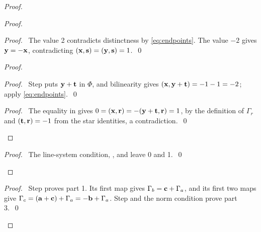 \begin{proof}
{  }
 \begin{proof}
  \begin{proof}
   \pf\ The value 2 contradicts distinctness by \eqref{eq:endpoints}.
   The value $-2$ gives ${\mathbf y}=-{\mathbf x}$, contradicting
   $({\mathbf x},{\mathbf s})=({\mathbf y},{\mathbf s})=1$.~\qed
  \end{proof}
  \begin{proof}
   \begin{proof}
    \pf\ Step  puts ${\mathbf y}+{\mathbf t}$ in $\Phi$, and bilinearity gives
    $({\mathbf x},{\mathbf y}+{\mathbf t})=-1-1=-2$; apply \eqref{eq:endpoints}.~\qed
   \end{proof}
   \qedstep
   \begin{proof}
    \pf\ The equality in  gives
    $0=({\mathbf x},{\mathbf r})=-({\mathbf y}+{\mathbf t},{\mathbf r})=1$, by the definition of $\Gamma_r$
    and $({\mathbf t},{\mathbf r})=-1$ from the star identities, a contradiction.~\qed
   \end{proof}
  \end{proof}
  \qedstep
  \begin{proof}\pf\ The line-system condition, , and  leave 0 and 1.~\qed\end{proof}
 \end{proof}
 \qedstep
 \begin{proof}
  \pf\ Step  proves part 1. Its first map gives
  $\Gamma_b={\mathbf c}+\Gamma_a$, and its first two maps give
  $\Gamma_c=({\mathbf a}+{\mathbf c})+\Gamma_a=-{\mathbf b}+\Gamma_a$. Step  and the norm condition prove part 3.~\qed
 \end{proof}
\end{proof}

